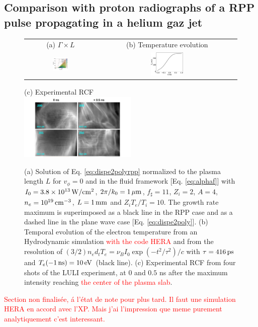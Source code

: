 \documentclass[
 reprint,
 amsmath,amssymb,
 aps,
]{revtex4-1}
\begin{document}
\subsection{Comparison with proton radiographs of a RPP pulse propagating in a helium gaz jet}
\begin{figure}
\begin{tabular}{cc}
(a) $\Gamma \times L$ &
(b) Temperature evolution \\
\includegraphics[width=0.24\textwidth]{XpFuchs.png}& 
\includegraphics[width=0.24\textwidth]{XpFuchs_te.eps}
\end{tabular}
(c) Experimental RCF \\
\includegraphics[width=0.5\textwidth]{rcf.png}
\caption{ \label{fig:xpfuchs}  
(a) Solution of Eq. \eqref{eq:dispe2polyrpp} normalized to the plasma length  $L$  for $v_\phi=0$ and in the fluid framework [Eq. \eqref{eq:alphaf}] with $I_0=3.8\times 10^{13}\, \rm W/cm^2$, $2\pi/k_0=1\,\rm\mu m$, $f_\sharp=11$, $Z_i=2$, $A=4$, $n_e=10^{19} \,\rm cm^{-3}$,  $L=1\,\rm mm$ and  $Z_iT_e/T_i=10$. 
The growth rate maximum is superimposed as a  black line in the RPP case and as a dashed line in the plane wave case [Eq. \eqref{eq:dispe2poly}].
(b) Temporal evolution of the electron temperature from an Hydrodynamic simulation  \textcolor{red}{with the code HERA} and from the resolution of $(3/2)n_e d_tT_e=\nu_BI_0\exp(-t^2/\tau^2)/c$ with $\tau = 416\,\rm ps$  and $T_e(-1 \, \rm{ns})=10\,\rm eV$ (black line).
(c) Experimental RCF from four shots of the LULI experiment, at $0$ and $0.5$ ns after the maximum intensity reaching \textcolor{red}{the center of the plasma slab}. 
 }
\end{figure}
\textcolor{red}{Section non finalis\'ee, \'a l'\'etat de note pour plus tard. Il faut une simulation HERA en accord avec l'XP. Mais j'ai l'impression que meme purement analytiquement c'est interessant.}
\end{document}
